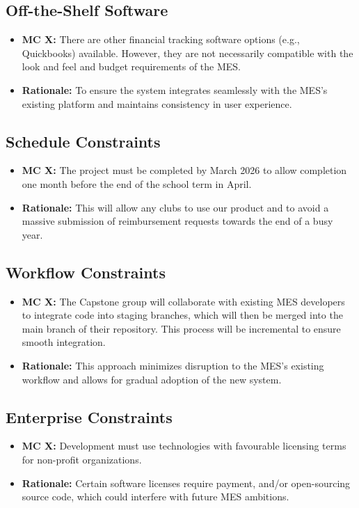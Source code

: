 \documentclass[12pt]{article}
\begin{document}
\subsection{Off-the-Shelf Software}
  \begin{itemize}
    \item \textbf{MC X:} There are other financial tracking software options (e.g., Quickbooks) available. However, they are not necessarily compatible with the look and feel and budget requirements of the MES.
    \item \textbf{Rationale:} To ensure the system integrates seamlessly with the MES's existing platform and maintains consistency in user experience.
  \end{itemize}

\subsection{Schedule Constraints}
  \begin{itemize}
    \item \textbf{MC X:} The project must be completed by March 2026 to allow completion one month before the end of the school term in April.
    \item \textbf{Rationale:} This will allow any clubs to use our product and to avoid a massive submission of reimbursement requests towards the end of a busy year.
  \end{itemize}

\subsection{Workflow Constraints}
  \begin{itemize}
    \item \textbf{MC X:} The Capstone group will collaborate with existing MES developers to integrate code into staging branches, which will then be merged into the main branch of their repository. This process will be incremental to ensure smooth integration.
    \item \textbf{Rationale:} This approach minimizes disruption to the MES's existing workflow and allows for gradual adoption of the new system.
  \end{itemize}

\subsection{Enterprise Constraints}
  \begin{itemize}
    \item \textbf{MC X:} Development must use technologies with favourable licensing terms for non-profit organizations.
    \item \textbf{Rationale:} Certain software licenses require payment, and/or open-sourcing source code, which could interfere with future MES ambitions.
\end{itemize}
\end{document}
